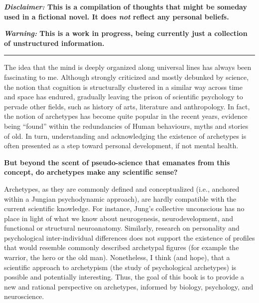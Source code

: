 \documentclass[
]{book}
\begin{document}
\textbf{\emph{Disclaimer:} This is a compilation of thoughts that might be someday used in a fictional novel. It does \emph{not} reflect any personal beliefs.}

\textbf{\emph{Warning:} This is a work in progress, being currently just a collection of unstructured information.}

\begin{center}\rule{0.5\linewidth}{0.5pt}\end{center}

The idea that the mind is deeply organized along universal lines has always been fascinating to me. Although strongly criticized and mostly debunked by science, the notion that cognition is structurally clustered in a similar way across time and space has endured, gradually leaving the prison of scientific psychology to pervade other fields, such as history of arts, literature and anthropology. In fact, the notion of archetypes has become quite popular in the recent years, evidence being ``found'' within the redundancies of Human behaviours, myths and stories of old. In turn, understanding and acknowledging the existence of archetypes is often presented as a step toward personal development, if not mental health.

\textbf{But beyond the scent of pseudo-science that emanates from this concept, do archetypes make any scientific sense?}

Archetypes, as they are commonly defined and conceptualized (i.e., anchored within a Jungian psychodynamic approach), are hardly compatible with the current scientific knowledge. For instance, Jung's collective unconscious has no place in light of what we know about neurogenesis, neurodevelopment, and functional or structural neuroanatomy. Similarly, research on personality and psychological inter-individual differences does not support the existence of profiles that would resemble commonly described archetypal figures (for example the warrior, the hero or the old man). Nonetheless, I think (and hope), that a scientific approach to archetypism (the study of psychological archetypes) is possible and potentially interesting. Thus, the goal of this book is to provide a new and rational perspective on archetypes, informed by biology, psychology, and neuroscience.
\end{document}
